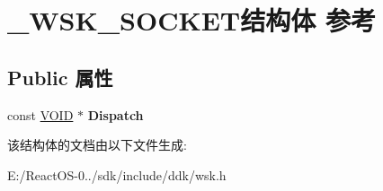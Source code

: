 \hypertarget{struct___w_s_k___s_o_c_k_e_t}{}\section{\+\_\+\+W\+S\+K\+\_\+\+S\+O\+C\+K\+E\+T结构体 参考}
\label{struct___w_s_k___s_o_c_k_e_t}
\subsection*{Public 属性}
\begin{DoxyCompactItemize}
\item 
\mbox{\label{struct___w_s_k___s_o_c_k_e_t_a4ffc295c3c278f18d8dac7a9ba01384e}} 
const \hyperlink{interfacevoid}{V\+O\+ID} $\ast$ {\bfseries Dispatch}
\end{DoxyCompactItemize}


该结构体的文档由以下文件生成\+:\begin{DoxyCompactItemize}
\item 
E\+:/\+React\+O\+S-\/0../sdk/include/ddk/wsk.\+h\end{DoxyCompactItemize}
